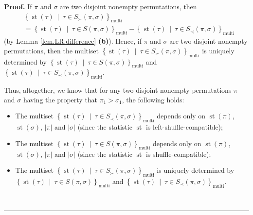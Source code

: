 \documentclass[numbers=enddot,12pt,final,onecolumn,notitlepage]{scrartcl}%
\theoremstyle{definition}
\newenvironment{proof}[1][Proof]{\noindent\textbf{#1.} }{\ \rule{0.5em}{0.5em}}
\newenvironment{verlong}{}{}
\begin{document}
\begin{verlong}
\begin{proof}
If $\pi$ and $\sigma$ are two disjoint nonempty permutations, then%
\begin{align*}
&  \left\{  \operatorname*{st}\left(  \tau\right)  \ \mid\ \tau\in S_{\succ
}\left(  \pi,\sigma\right)  \right\}  _{\operatorname*{multi}}\\
&  =\left\{  \operatorname*{st}\left(  \tau\right)  \ \mid\ \tau\in S\left(
\pi,\sigma\right)  \right\}  _{\operatorname*{multi}}-\left\{
\operatorname*{st}\left(  \tau\right)  \ \mid\ \tau\in S_{\prec}\left(
\pi,\sigma\right)  \right\}  _{\operatorname*{multi}}%
\end{align*}
(by Lemma \ref{lem.LR.difference} \textbf{(b)}). Hence, if $\pi$ and $\sigma$
are two disjoint nonempty permutations, then the multiset $\left\{
\operatorname*{st}\left(  \tau\right)  \ \mid\ \tau\in S_{\succ}\left(
\pi,\sigma\right)  \right\}  _{\operatorname*{multi}}$ is uniquely determined
by $\left\{  \operatorname*{st}\left(  \tau\right)  \ \mid\ \tau\in S\left(
\pi,\sigma\right)  \right\}  _{\operatorname*{multi}}$ and $\left\{
\operatorname*{st}\left(  \tau\right)  \ \mid\ \tau\in S_{\prec}\left(
\pi,\sigma\right)  \right\}  _{\operatorname*{multi}}$.

Thus, altogether, we know that for any two disjoint nonempty permutations
$\pi$ and $\sigma$ having the property that $\pi_{1}>\sigma_{1}$, the
following holds:

\begin{itemize}
\item The multiset $\left\{  \operatorname*{st}\left(  \tau\right)
\ \mid\ \tau\in S_{\prec}\left(  \pi,\sigma\right)  \right\}
_{\operatorname*{multi}}$ depends only on $\operatorname*{st}\left(
\pi\right)  $, $\operatorname*{st}\left(  \sigma\right)  $, $\left\vert
\pi\right\vert $ and $\left\vert \sigma\right\vert $ (since the statistic
$\operatorname*{st}$ is left-shuffle-compatible);

\item The multiset $\left\{  \operatorname*{st}\left(  \tau\right)
\ \mid\ \tau\in S\left(  \pi,\sigma\right)  \right\}  _{\operatorname*{multi}%
}$ depends only on $\operatorname*{st}\left(  \pi\right)  $,
$\operatorname*{st}\left(  \sigma\right)  $, $\left\vert \pi\right\vert $ and
$\left\vert \sigma\right\vert $ (since the statistic $\operatorname*{st}$ is shuffle-compatible);

\item The multiset $\left\{  \operatorname*{st}\left(  \tau\right)
\ \mid\ \tau\in S_{\succ}\left(  \pi,\sigma\right)  \right\}
_{\operatorname*{multi}}$ is uniquely determined by \newline$\left\{
\operatorname*{st}\left(  \tau\right)  \ \mid\ \tau\in S\left(  \pi
,\sigma\right)  \right\}  _{\operatorname*{multi}}$ and $\left\{
\operatorname*{st}\left(  \tau\right)  \ \mid\ \tau\in S_{\prec}\left(
\pi,\sigma\right)  \right\}  _{\operatorname*{multi}}$.
\end{itemize}


\end{proof}
\end{verlong}
\end{document}
